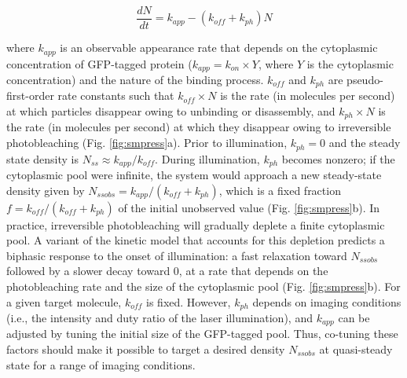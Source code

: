\begin{equation}
\frac{dN}{dt} = k_{app}-(k_{off}+k_{ph})N
\end{equation}

where $k_{app}$ is an observable appearance rate that depends on the cytoplasmic concentration of GFP-tagged protein ($k_{app} = k_{on} \times Y$, where $Y$ is the cytoplasmic concentration) and the nature of the binding process. $k_{off}$ and $k_{ph}$ are pseudo-first-order rate constants such that $k_{off} \times N$ is the rate (in molecules per second) at which particles disappear owing to unbinding or disassembly, and $k_{ph} \times N$ is the rate (in molecules per second) at which they disappear owing to irreversible photobleaching (Fig. \ref{fig:smpress}a). Prior to illumination, $k_{ph} = 0$ and the steady state density is $N_{ss} \approx k_{app}/k_{off}$. During illumination, $k_{ph}$ becomes nonzero; if the cytoplasmic pool were infinite, the system would approach a new steady-state density given by $N_{ssobs} = k_{app}/(k_{off} + k_{ph})$, which is a fixed fraction $f = k_{off}/(k_{off} + k_{ph})$ of the initial unobserved value (Fig. \ref{fig:smpress}b). In practice, irreversible photobleaching will gradually deplete a finite cytoplasmic pool. A variant of the kinetic model that accounts for this depletion predicts a biphasic response to the onset of illumination: a fast relaxation toward $N_{ssobs}$ followed by a slower decay toward 0, at a rate that depends on the photobleaching rate and the size of the cytoplasmic pool (Fig. \ref{fig:smpress}b). For a given target molecule, $k_{off}$ is fixed. However, $k_{ph}$ depends on imaging conditions (i.e., the intensity and duty ratio of the laser illumination), and $k_{app}$ can be adjusted by tuning the initial size of the GFP-tagged pool. Thus, co-tuning these factors should make it possible to target a desired density $N_{ssobs}$ at quasi-steady state for a range of imaging conditions.

